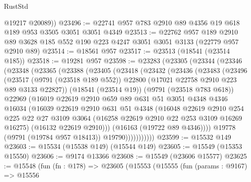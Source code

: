 \begin{lexlean}{RustStd}
\begin{coremodule}
        @19217
        @20089))
@23496 := @22741 @957 @783 @2910 @89 @4356 @19 @618 @189 @953 @3505 @3051 @3051 @4349
@23513 := @22762
    @957
    @189
    @2910
    @89
    @3628
    @185
    @552
    @190
    @223
    @4247
    @3051
    @3051
    @3133
    (@22779 @957 @2910 @89)
@23514 := @18561 @957
@23517 := @23513 (@18541 (@23514 @185))
@23518 := @19281 @957
@23598 := @23283
    (@23305
      (@23344
        (@23346
          (@23348
            (@23365
              (@23388
                (@23405
                  (@23418
                    (@23432
                      (@23436
                        (@23483
                          (@23496
                            (@23517
                              (@9791 (@23518 @189 @552))
                              @22800
                              (@17021 @22758 @2910 @223 @89 @3133 @22827))
                            (@18541 (@23514 @19))
                            (@9791 (@23518 @783 @618))
                            @22969
                            (@16019
                              @22619
                              @2910
                              @659
                              @89
                              @631
                              @51
                              @3051
                              @4348
                              @4346
                              @16034
                              (@16039
                                @22619
                                @2910
                                @631
                                @51
                                @4348
                                (@16048
                                  @22619
                                  @2910
                                  @254
                                  @225
                                  @22
                                  @27
                                  @3109
                                  @3064
                                  (@16258 @22619 @2910 @22 @253 @3109 @16269 @16275)
                                  (@16132 @22619 @2910)))
                              (@16163 (@19722 @89 @4346))))
                          @19778
                          (@9791 (@19784 @957 @18413))
                          @19790)))))))))))
@23599 := @15532 @149
@23603 := @15534 (@15538 @149) (@15544 @149)
@23605 := @15549 (@15353 @15550)
@23606 := @9174 @13366
@23608 := @15549 (@23606 @15577)
@23625 := @15548
    (fun (fn : @178) =>
    @23605
      (@15553
        (@15555
          (fun (params : @9167) =>
          @15556

\end{coremodule}
\end{lexlean}

